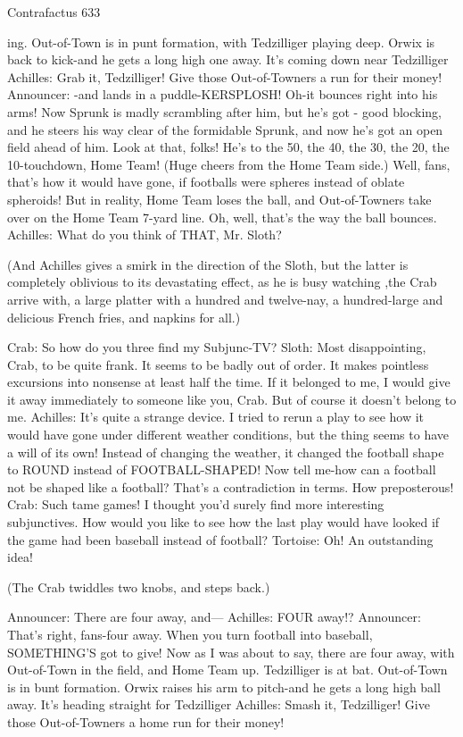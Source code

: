 Contrafactus                                                                           633

  ing. Out-of-Town is in punt formation, with Tedzilliger playing deep. Orwix is back to
  kick-and he gets a long high one away. It's coming down near Tedzilliger
Achilles: Grab it, Tedzilliger! Give those Out-of-Towners a run for their money!
Announcer: -and lands in a puddle-KERSPLOSH! Oh-it bounces right into his arms!
  Now Sprunk is madly scrambling after him, but he's got - good blocking, and he steers
  his way clear of the formidable Sprunk, and now he's got an open field ahead of him.
  Look at that, folks! He's to the 50, the 40, the 30, the 20, the 10-touchdown, Home
  Team! (Huge cheers from the Home Team side.) Well, fans, that's how it would have
  gone, if footballs were spheres instead of oblate spheroids! But in reality, Home Team
  loses the ball, and Out-of-Towners take over on the Home Team 7-yard line. Oh, well,
  that's the way the ball bounces.
Achilles: What do you think of THAT, Mr. Sloth?

   (And Achilles gives a smirk in the direction of the Sloth, but the latter is completely
   oblivious to its devastating effect, as he is busy watching ,the Crab arrive with, a large
   platter with a hundred and twelve-nay, a hundred-large and delicious French fries,
   and napkins for all.)

Crab: So how do you three find my Subjunc-TV?
Sloth: Most disappointing, Crab, to be quite frank. It seems to be badly out of order. It
   makes pointless excursions into nonsense at least half the time. If it belonged to me, I
   would give it away immediately to someone like you, Crab. But of course it doesn't
   belong to me.
Achilles: It's quite a strange device. I tried to rerun a play to see how it would have gone
   under different weather conditions, but the thing seems to have a will of its own!
   Instead of changing the weather, it changed the football shape to ROUND instead of
   FOOTBALL-SHAPED! Now tell me-how can a football not be shaped like a football?
   That's a contradiction in terms. How preposterous!
Crab: Such tame games! I thought you'd surely find more interesting subjunctives. How
   would you like to see how the last play would have looked if the game had been
   baseball instead of football?
   Tortoise: Oh! An outstanding idea!

(The Crab twiddles two knobs, and steps back.)

Announcer: There are four away, and---
Achilles: FOUR away!?
Announcer: That's right, fans-four away. When you turn football into baseball,
  SOMETHING'S got to give! Now as I was about to say, there are four away, with
  Out-of-Town in the field, and Home Team up. Tedzilliger is at bat. Out-of-Town is in
  bunt formation. Orwix raises his arm to pitch-and he gets a long high ball away. It's
  heading straight for Tedzilliger
Achilles: Smash it, Tedzilliger! Give those Out-of-Towners a home run for their money!




